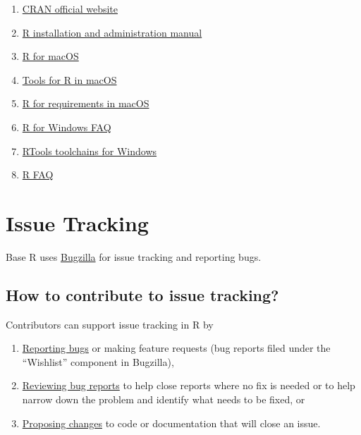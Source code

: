 \documentclass[
]{book}
\begin{document}
\begin{enumerate}
\def\labelenumi{\arabic{enumi}.}
\item
  \href{https://cran.r-project.org}{CRAN official website}
\item
  \href{https://cran.r-project.org/doc/manuals/r-patched/R-admin.html}{R installation and administration manual}
\item
  \href{https://mac.r-project.org/}{R for macOS}
\item
  \href{https://mac.r-project.org/tools/}{Tools for R in macOS}
\item
  \href{https://mac.r-project.org/src/}{R for requirements in macOS}
\item
  \href{https://cran.r-project.org/bin/windows/base/rw-FAQ.html}{R for Windows FAQ}
\item
  \href{https://cran.r-project.org/bin/windows/Rtools/}{RTools toolchains for Windows}
\item
  \href{https://cran.r-project.org/doc/FAQ/R-FAQ.html}{R FAQ}
\end{enumerate}

\hypertarget{IssueTrack}{%
\chapter{Issue Tracking}\label{IssueTrack}}

Base R uses \href{https://bugs.r-project.org/}{Bugzilla} for issue tracking and reporting bugs.

\hypertarget{how-to-contribute-to-issue-tracking}{%
\section{How to contribute to issue tracking?}\label{how-to-contribute-to-issue-tracking}}

Contributors can support issue tracking in R by

\begin{enumerate}
\def\labelenumi{\arabic{enumi}.}
\item
  \href{https://contributor.r-project.org/rdevguide/ReportBugs.html}{Reporting bugs} or making feature requests (bug reports filed under the ``Wishlist'' component in Bugzilla),
\item
  \href{https://contributor.r-project.org/rdevguide/ReviewBugs.html}{Reviewing bug reports} to help close reports where no fix is needed or to help narrow down the problem and identify what needs to be fixed, or
\item
  \href{https://contributor.r-project.org/rdevguide/FixBug.html\#FixBug}{Proposing changes} to code or documentation that will close an issue.
\end{enumerate}
\end{document}
